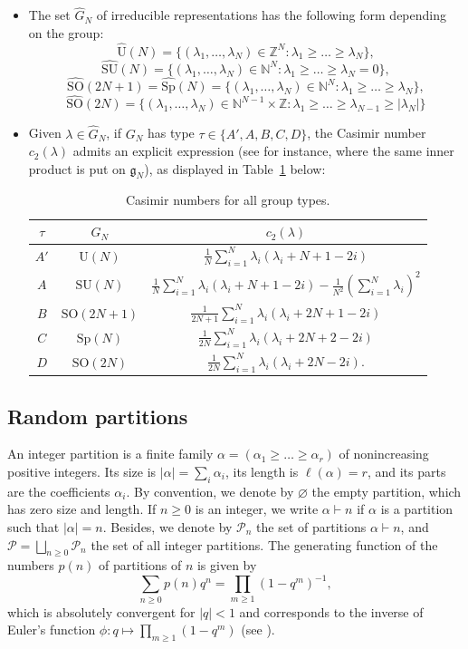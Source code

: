\documentclass[11pt,a4paper,reqno]{article}
\theoremstyle{definition}
\theoremstyle{remark}
\newcommand\SU{{\mathrm{SU}}}
\newcommand\SO{{\mathrm{SO}}}
\newcommand\Sp{{\mathrm{Sp}}}
\newcommand\U{{\mathrm U}}
\newcommand\Z{{\mathbb Z}}
\newcommand\N{{\mathbb N}}
\newcommand\Pfr{\mathscr{P}}
\begin{document}
\begin{itemize}
\item The set $\widehat{G}_N$ of irreducible representations has the following form depending on the group:
\[
\widehat{\U}(N)=\{(\lambda_1,\ldots,\lambda_N)\in\Z^N:\lambda_1\geq\ldots\geq\lambda_N\},
\]
\[
\widehat{\SU}(N)=\{(\lambda_1,\ldots,\lambda_N)\in\N^N:\lambda_1\geq\ldots\geq\lambda_N=0\},
\]
\[
\widehat{\SO}(2N+1)=\widehat{\Sp}(N)=\{(\lambda_1,\ldots,\lambda_N)\in\N^N:\lambda_1\geq\ldots\geq\lambda_N\},
\]
\[
\widehat{\SO}(2N)=\{(\lambda_1,\ldots,\lambda_N)\in\N^{N-1}\times \Z:\lambda_1\geq\ldots\geq\lambda_{N-1}\geq\vert\lambda_N\vert\}
\]
\item Given $\lambda\in\widehat{G}_N$, if $G_N$ has type $\tau\in\{A',A,B,C,D\}$, the Casimir number $c_2(\lambda)$ admits an explicit expression (see \cite{DL} for instance, where the same inner product is put on $\mathfrak{g}_N$), as displayed in Table~\ref{tab:Casimirs} below:
\renewcommand\arraystretch{1.5}
\begin{table}[h!]
    \centering
    \begin{tabular}{|c|c|c|}
     \hline $\tau$ & $G_N$ & $c_2(\lambda)$\\
\hline $A'$ & $\U(N)$ & $\frac{1}{N}\sum_{i=1}^N\lambda_i(\lambda_i+N+1-2i)$ \\
\hline
$A$ & $\SU(N)$ & $\frac{1}{N}\sum_{i=1}^N\lambda_i(\lambda_i+N+1-2i)-\frac{1}{N^2}\left(\sum_{i=1}^N\lambda_i\right)^2$\\ \hline
$B$ & $\SO(2N+1)$ & $\frac{1}{2N+1}\sum_{i=1}^N\lambda_i(\lambda_i+2N+1-2i)$\\ \hline
$C$ & $\Sp(N)$ & $\frac{1}{2N}\sum_{i=1}^N\lambda_i(\lambda_i+2N+2-2i)$\\ \hline
$D$ & $\SO(2N)$ & $\frac{1}{2N}\sum_{i=1}^N\lambda_i(\lambda_i+2N-2i)$.\\ 
\hline
    \end{tabular}
    \caption{Casimir numbers for all group types.}
    \label{tab:Casimirs}
\end{table}
\end{itemize}

\subsection{Random partitions}\label{sec:random_partitions}

An integer partition is a finite family $\alpha=(\alpha_1\geq\ldots\geq\alpha_r)$ of nonincreasing positive integers. Its size is $\vert\alpha\vert=\sum_i\alpha_i$, its length is $\ell(\alpha)=r$, and its parts are the coefficients $\alpha_i$. By convention, we denote by $\varnothing$ the empty partition, which has zero size and length. If $n\geq 0$ is an integer, we write $\alpha\vdash n$ if $\alpha$ is a partition such that $\vert\alpha\vert=n$. Besides, we denote by $\Pfr_n$ the set of partitions $\alpha\vdash n$, and $\Pfr=\bigsqcup_{n\geq 0}\Pfr_n$ the set of all integer partitions. The generating function of the numbers $p(n)$ of partitions of $n$ is given by
\[
\sum_{n\geq 0}p(n)q^n=\prod_{m\geq 1}(1-q^m)^{-1},
\]
which is absolutely convergent for $\vert q\vert <1$ and corresponds to the inverse of Euler's function $\phi:q\mapsto\prod_{m\geq 1} (1-q^m)$ (see \cite[\S 14.3]{Apo}).
\end{document}

